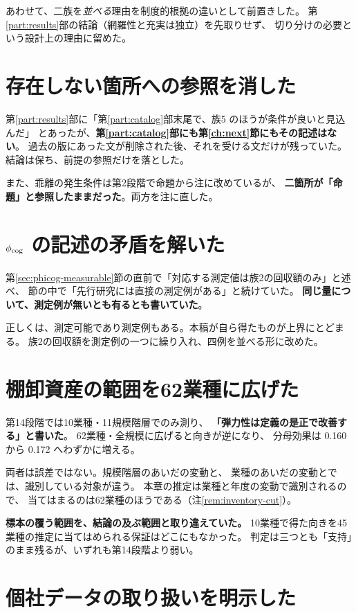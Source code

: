 あわせて、二族を\emph{並べる}理由を制度的根拠の違いとして前置きした。
第\ref{part:results}部の結論（網羅性と充実は独立）を先取りせず、
切り分けの必要という設計上の理由に留めた。

\section{存在しない箇所への参照を消した}

第\ref{part:results}部に「第\ref{part:catalog}部末尾で、族5 のほうが条件が良いと見込んだ」
とあったが、\textbf{第\ref{part:catalog}部にも第\ref{ch:next}節にもその記述はない}。
過去の版にあった文が削除された後、それを受ける文だけが残っていた。
結論は保ち、前提の参照だけを落とした。

また、乖離の発生条件は第2段階で命題から注に改めているが、
\textbf{二箇所が「命題」と参照したままだった}。両方を注に直した。

\section{\texorpdfstring{$\phi_{\rm cog}$}{phi-cog} の記述の矛盾を解いた}

第\ref{sec:phicog-measurable}節の直前で「対応する測定値は族2の回収額のみ」と述べ、
節の中で「先行研究には直接の測定例がある」と続けていた。
\textbf{同じ量について、測定例が無いとも有るとも書いていた}。

正しくは、測定可能であり測定例もある。本稿が自ら得たものが上界にとどまる。
族2の回収額を測定例の一つに繰り入れ、四例を並べる形に改めた。

\section{棚卸資産の範囲を62業種に広げた}

第14段階では10業種・11規模階層でのみ測り、
\textbf{「弾力性は定義の是正で改善する」と書いた}。
62業種・全規模に広げると向きが逆になり、
分母効果は 0.160 から 0.172 へわずかに増える。

両者は誤差ではない。規模階層のあいだの変動と、
業種のあいだの変動とでは、識別している対象が違う。
本章の推定は業種と年度の変動で識別されるので、
当てはまるのは62業種のほうである（注\ref{rem:inventory-cut}）。

\textbf{標本の覆う範囲を、結論の及ぶ範囲と取り違えていた。}
10業種で得た向きを45業種の推定に当てはめられる保証はどこにもなかった。
判定は三つとも「支持」のまま残るが、いずれも第14段階より弱い。

\section{個社データの取り扱いを明示した}

